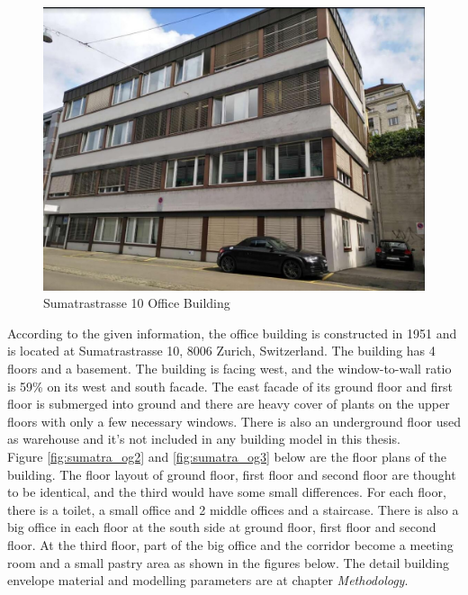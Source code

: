\documentclass[a4paper, oneside]{discothesis}
\begin{document}
		\begin{figure}[ht]
		\centering
		\includegraphics[scale=0.45]{Sumatra_photo.jpg}
		\caption{Sumatrastrasse 10 Office Building}
		\label{fig:Sumatra_photo}
		\end{figure}
		 
		
		According to the given information, the office building is constructed in 1951 and is located at Sumatrastrasse 10, 8006 Zurich, Switzerland. The building has 4 floors and a basement. The building  is facing west, and the window-to-wall ratio is 59\% on its west and south facade. The east facade of its ground floor and first floor is submerged into ground and there are heavy cover of plants on the upper floors with only a few necessary windows. There is also an underground floor used as warehouse and it's not included in any building model in this thesis.\\

		Figure \ref{fig:sumatra_og2} and \ref{fig:sumatra_og3} below are the floor plans of the building.
		The floor layout of ground floor, first floor and second floor are thought to be identical, and the third would have some small differences. For each floor, there is a toilet, a small office and 2 middle offices and a staircase. There is also a big office in each floor at the south side at ground floor, first floor and second floor. At the third floor, part of the big office and the corridor become a meeting room and a small pastry area as shown in the figures below. The detail building envelope material and modelling parameters are at chapter \textit{Methodology}.
		
\end{document}
